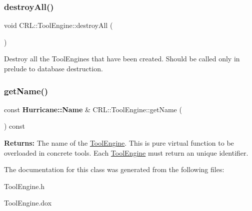\subsubsection{\texorpdfstring{destroy\+All()}{destroyAll()}}
{\footnotesize\ttfamily void C\+R\+L\+::\+Tool\+Engine\+::destroy\+All (\begin{DoxyParamCaption}{ }\end{DoxyParamCaption})\hspace{0.3cm}{\ttfamily [static]}}

Destroy all the Tool\+Engines that have been created. Should be called only in prelude to database destruction. \mbox{\label{classCRL_1_1ToolEngine_a98c8fd84e7ea36d25287c08b75e9d5e7}} 
\subsubsection{\texorpdfstring{get\+Name()}{getName()}}
{\footnotesize\ttfamily const \textbf{ Hurricane\+::\+Name} \& C\+R\+L\+::\+Tool\+Engine\+::get\+Name (\begin{DoxyParamCaption}{ }\end{DoxyParamCaption}) const\hspace{0.3cm}{\ttfamily [pure virtual]}}

{\bfseries Returns\+:} The name of the \mbox{\hyperlink{classCRL_1_1ToolEngine}{Tool\+Engine}}. This is pure virtual function to be overloaded in concrete tools. Each \mbox{\hyperlink{classCRL_1_1ToolEngine}{Tool\+Engine}} must return an unique identifier. 

The documentation for this class was generated from the following files\+:\begin{DoxyCompactItemize}
\item 
Tool\+Engine.\+h\item 
Tool\+Engine.\+dox\end{DoxyCompactItemize}
